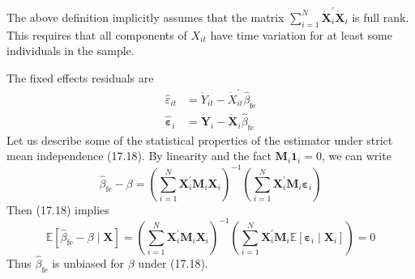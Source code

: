\documentclass[10pt]{article}
\begin{document}
The above definition implicitly assumes that the matrix $\sum_{i=1}^{N} \dot{\boldsymbol{X}}_{i}^{\prime} \dot{\boldsymbol{X}}_{i}$ is full rank. This requires that all components of $X_{i t}$ have time variation for at least some individuals in the sample.

The fixed effects residuals are
$$
\begin{aligned}
\widehat{\varepsilon}_{i t} &=\dot{Y}_{i t}-\dot{X}_{i t}^{\prime} \widehat{\beta}_{\mathrm{fe}} \\
\widehat{\boldsymbol{\varepsilon}}_{i} &=\dot{\boldsymbol{Y}}_{i}-\dot{\boldsymbol{X}}_{i} \widehat{\beta}_{\mathrm{fe}}
\end{aligned}
$$
Let us describe some of the statistical properties of the estimator under strict mean independence (17.18). By linearity and the fact $\boldsymbol{M}_{i} \mathbf{1}_{i}=0$, we can write
$$
\widehat{\beta}_{\mathrm{fe}}-\beta=\left(\sum_{i=1}^{N} \boldsymbol{X}_{i}^{\prime} \boldsymbol{M}_{i} \boldsymbol{X}_{i}\right)^{-1}\left(\sum_{i=1}^{N} \boldsymbol{X}_{i}^{\prime} \boldsymbol{M}_{i} \boldsymbol{\varepsilon}_{i}\right)
$$
Then (17.18) implies
$$
\mathbb{E}\left[\widehat{\beta}_{\mathrm{fe}}-\beta \mid \boldsymbol{X}\right]=\left(\sum_{i=1}^{N} \boldsymbol{X}_{i}^{\prime} \boldsymbol{M}_{i} \boldsymbol{X}_{i}\right)^{-1}\left(\sum_{i=1}^{N} \boldsymbol{X}_{i}^{\prime} \boldsymbol{M}_{i} \mathbb{E}\left[\boldsymbol{\varepsilon}_{i} \mid \boldsymbol{X}_{i}\right]\right)=0
$$
Thus $\widehat{\beta}_{\mathrm{fe}}$ is unbiased for $\beta$ under (17.18).
\end{document}
